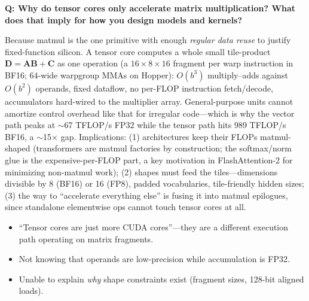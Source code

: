 \begin{interviewq}
\textbf{Q: Why do tensor cores only accelerate matrix multiplication? What does that imply for how you design models and kernels?}

 \quad {} \quad \badgefreq{\freqmed}

\stronganswer Because matmul is the one primitive with enough \textit{regular data reuse} to justify fixed-function silicon. A tensor core computes a whole small tile-product $\mathbf{D} = \mathbf{A}\mathbf{B} + \mathbf{C}$ as one operation (a $16{\times}8{\times}16$ fragment per warp instruction in BF16; $64$-wide warpgroup MMAs on Hopper): $O(b^3)$ multiply--adds against $O(b^2)$ operands, fixed dataflow, no per-FLOP instruction fetch/decode, accumulators hard-wired to the multiplier array. General-purpose units cannot amortize control overhead like that for irregular code---which is why the vector path peaks at $\sim$67 TFLOP/s FP32 while the tensor path hits 989 TFLOP/s BF16, a $\sim$15$\times$ gap. Implications: (1) architectures keep their FLOPs matmul-shaped (transformers are matmul factories by construction; the softmax/norm glue is the expensive-per-FLOP part, a key motivation in FlashAttention-2 for minimizing non-matmul work); (2) shapes must feed the tiles---dimensions divisible by 8 (BF16) or 16 (FP8), padded vocabularies, tile-friendly hidden sizes; (3) the way to ``accelerate everything else'' is fusing it into matmul epilogues, since standalone elementwise ops cannot touch tensor cores at all.

\redflags
\begin{itemize}
    \item ``Tensor cores are just more CUDA cores''---they are a different execution path operating on matrix fragments.
    \item Not knowing that operands are low-precision while accumulation is FP32.
    \item Unable to explain \textit{why} shape constraints exist (fragment sizes, 128-bit aligned loads).
\end{itemize}


\end{interviewq}

